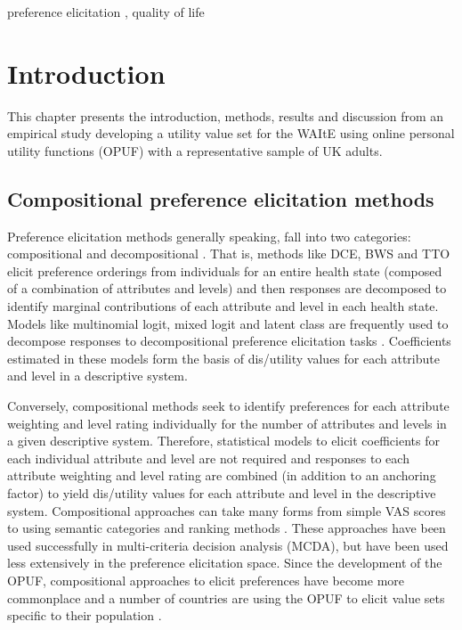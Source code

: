 \documentclass[
  number,
  preprint]{elsarticle}
\begin{document}
\begin{frontmatter}
\begin{keyword}
    preference elicitation \sep 
    quality of life
\end{keyword}
\end{frontmatter}
    

\section{Introduction}\label{sec-introduction}

This chapter presents the introduction, methods, results and discussion
from an empirical study developing a utility value set for the WAItE
using online personal utility functions (OPUF) with a representative
sample of UK adults.

\subsection{Compositional preference elicitation
methods}\label{compositional-preference-elicitation-methods}

Preference elicitation methods generally speaking, fall into two
categories: compositional and decompositional
\citep{Keeney1979DecisionsTrade-Offs, Marsh2016MultipleForce, Belton2002MultipleAnalysis}.
That is, methods like DCE, BWS and TTO elicit preference orderings from
individuals for an entire health state (composed of a combination of
attributes and levels) and then responses are decomposed to identify
marginal contributions of each attribute and level in each health state.
Models like multinomial logit, mixed logit and latent class are
frequently used to decompose responses to decompositional preference
elicitation tasks \citep{Hauber2016StatisticalForce}. Coefficients
estimated in these models form the basis of dis/utility values for each
attribute and level in a descriptive system.

Conversely, compositional methods seek to identify preferences for each
attribute weighting and level rating individually for the number of
attributes and levels in a given descriptive system. Therefore,
statistical models to elicit coefficients for each individual attribute
and level are not required and responses to each attribute weighting and
level rating are combined (in addition to an anchoring factor) to yield
dis/utility values for each attribute and level in the descriptive
system. Compositional approaches can take many forms from simple VAS
scores to using semantic categories and ranking methods
\citep{BanaECosta1999TheApplication, Danner2011IntegratingPreferences, Oliveira2018ValuingStates}.
These approaches have been used successfully in multi-criteria decision
analysis (MCDA), but have been used less extensively in the preference
elicitation space. Since the development of the OPUF, compositional
approaches to elicit preferences have become more commonplace and a
number of countries are using the OPUF to elicit value sets specific to
their population \citep{Brodszky2023PCR108States}.
\end{document}
